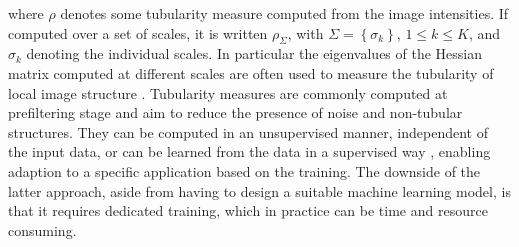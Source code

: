 where $ \rho $ denotes some tubularity measure computed from the image intensities. If computed over a set of scales, it is written $\rho_{\Sigma}$, with $\Sigma = \left\lbrace \sigma_k \right\rbrace$, $1 \leq k \leq K$, and $\sigma_k$ denoting the individual scales. In particular the eigenvalues of the Hessian matrix computed at different scales are often used to measure the tubularity of local image structure \cite{sato19973d, frangi1998multiscale, steger1998unbiased, meijering2004design}. Tubularity measures are commonly computed at prefiltering stage and aim to reduce the presence of noise and non-tubular structures. They can be computed in an unsupervised manner, independent of the input data, or can be learned from the data in a supervised way \cite{sironi2016multiscale,li2017deep}, enabling adaption to a specific application based on the training. The downside of the latter approach, aside from having to design a suitable machine learning model, is that it requires dedicated training, which in practice can be time and resource consuming.

